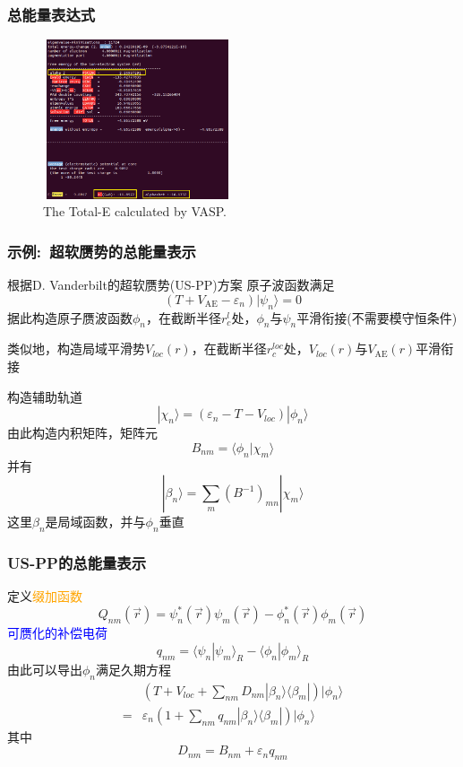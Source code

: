 {\frame
{
	\frametitle{总能量表达式}
\fontsize{6.5pt}{4.2pt}
\begin{figure}[h!]
\centering
\vspace*{-0.18in}
\includegraphics[height=1.85in,width=2.2in,viewport=0 0 600 495,clip]{Figures/VASP_Total_ENE.png}
\caption{\tiny \textrm{The Total-E calculated by VASP.}}%
\label{TOTEN_VASP}
\end{figure}
}

\frame
{
	\frametitle{示例:~超软赝势的总能量表示}
	根据\textrm{D. Vanderbilt}的超软赝势(\textrm{US-PP})方案
	原子波函数满足$$(T+V_{\mathrm{AE}}-\varepsilon_n)|\psi_n\rangle=0$$
	据此构造原子赝波函数$\phi_n$，在截断半径$r_c^l$处，$\phi_n$与$\psi_n$平滑衔接(不需要模守恒条件)

	类似地，构造局域平滑势$V_{loc}(r)$，在截断半径$r_c^{loc}$处，$V_{loc}(r)$与$V_{\mathrm{AE}}(r)$平滑衔接
	
	构造辅助轨道
	$$|\chi_n\rangle=(\varepsilon_n-T-V_{loc})|\phi_n\rangle$$
	由此构造内积矩阵，矩阵元$$B_{nm}=\langle\phi_n|\chi_m\rangle$$
	并有$$|\beta_n\rangle=\sum_m(B^{-1})_{mn}|\chi_m\rangle$$
	这里$\beta_n$是局域函数，并与$\phi_n$垂直
}

\frame
{
	\frametitle{\textrm{US-PP}的总能量表示}
	定义\textcolor{orange}{缀加函数}$$Q_{nm}(\vec r)=\psi_n^{\ast}(\vec r)\psi_m(\vec r)-\phi_n^{\ast}(\vec r)\phi_m(\vec r)$$
	\textcolor{blue}{可赝化的补偿电荷}$$q_{nm}=\langle\psi_n|\psi_m\rangle_R-\langle\phi_n|\phi_m\rangle_R$$
	由此可以导出$\phi_n$满足久期方程
	\begin{displaymath}
		\begin{aligned}
			&\left(T+V_{loc}+\sum_{nm}D_{nm}|\beta_n\rangle\langle\beta_m|\right)|\phi_n\rangle\\
			=&\varepsilon_n\left(1+\sum_{nm}q_{nm}|\beta_n\rangle\langle\beta_m|\right)|\phi_n\rangle
		\end{aligned}
	\end{displaymath}
	其中$$D_{nm}=B_{nm}+\varepsilon_nq_{nm}$$
}

}

